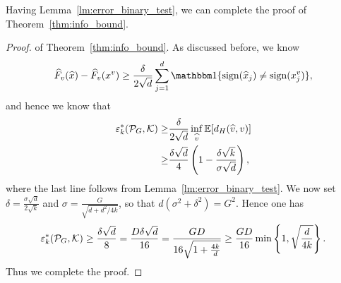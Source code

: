 Having Lemma~\ref{lm:error_binary_test}, we can complete the proof of Theorem~\ref{thm:info_bound}.

\begin{proof}{of Theorem~\ref{thm:info_bound}.}
As discussed before, we know
\begin{align*}
    \HF_v(\hat{x})-\HF_v(x^v)\geq\frac{\delta}{2\sqrt{d}}\sum_{j=1}^{d}\indicator\{\sign(\hat{x}_j)\neq \sign(x^v_j) \},
\end{align*}
and hence we know that
\begin{align*}
     \varepsilon_k^*(\mathcal P_G,\mathcal K)\geq & \frac{\delta}{2\sqrt{d}}\inf_{\widehat{v}}\operatorname*{\mathbb{E}}[d_H(\widehat{v},v)]\\
    \geq & \frac{\delta \sqrt{d}}{4}\left( 1-\frac{\delta\sqrt{k}}{\sigma\sqrt{d}}\right),
\end{align*}
where the last line follows from Lemma~\ref{lm:error_binary_test}.
We now set $\delta=\frac{\sigma \sqrt{d}}{2\sqrt{k}}$ and $\sigma=\frac{G}{\sqrt{d+d^2/4k}}$, so that $d(\sigma^2+\delta^2)=G^2$.
Hence one has
\begin{align*}
 \varepsilon_k^*(\mathcal P_G,\mathcal K)
\geq \frac{\delta\sqrt{d}}{8} 
= \frac{D\delta\sqrt{d}}{16}
= \frac{GD}{16\sqrt{1+\frac{4k}{d}}}
\ge \frac{GD}{16}\min\left\{1,\sqrt{\frac{d}{4k}}\right\}.
\end{align*}
Thus we complete the proof.
\end{proof}

